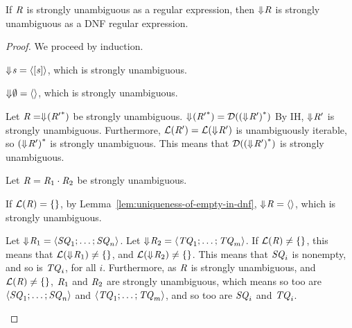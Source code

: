 \documentclass[numbers,10pt,preprint\ifanon ,nocopyrightspace\fi]{sigplanconf}
\begin{document}
\begin{lemma}
  \label{lem:retaining-unambiguity-todnf}
  If $\mathit{R}$ is strongly unambiguous as a regular expression, then
  $\Downarrow\mkern-4mu \mathit{R}$ is strongly unambiguous as a DNF regular expression.
\end{lemma}
\begin{proof}
  We proceed by induction.
  \begin{case}[\BaseRegexType{}]
    $\Downarrow\mkern-4mu \mathit{s} = \langle[\mathit{s}]\rangle$, which is strongly
    unambiguous.
  \end{case}

  \begin{case}[\EmptyRegexType{}]
    $\Downarrow\mkern-4mu \emptyset = \langle\rangle$, which is strongly unambiguous.
  \end{case}

  \begin{case}[\StarRegexType{}]
    Let $\mathit{R} = \Downarrow\mkern-4mu ({\mathit{R}'}^*)$ be strongly unambiguous.
    $\Downarrow\mkern-4mu ({\mathit{R}'}^*) =
    \mathcal{D}({(\Downarrow\mkern-4mu \mathit{R}')}^*)$
    By IH, $\Downarrow\mkern-4mu \mathit{R}'$ is strongly unambiguous.
    Furthermore, $\mathcal{L}(\mathit{R}') = \mathcal{L}(\Downarrow\mkern-4mu \mathit{R}')$ is
    unambiguously iterable, so ${(\Downarrow\mkern-4mu \mathit{R}')}^*$ is strongly
    unambiguous.  This means that
    $\mathcal{D}({(\Downarrow\mkern-4mu \mathit{R}')}^*)$ is strongly unambiguous.
  \end{case}

  \begin{case}[\ConcatRegexType{}]
    Let $\mathit{R} = \mathit{R}_1 \cdot \mathit{R}_2$ be strongly unambiguous.

    If $\mathcal{L}(\mathit{R}) = \{\}$, by
    Lemma~\ref{lem:uniqueness-of-empty-in-dnf}, $\Downarrow\mkern-4mu \mathit{R} =
    \langle\rangle$, which is strongly unambiguous.

    Let $\Downarrow\mkern-4mu \mathit{R}_1 = \langle\mathit{SQ}_1;\ldots;\mathit{SQ}_n\rangle$.
    Let $\Downarrow\mkern-4mu \mathit{R}_2 = \langle\mathit{TQ}_1;\ldots;\mathit{TQ}_m\rangle$.
    If $\mathcal{L}(\mathit{R}) \neq \{\}$, this means that
    $\mathcal{L}(\Downarrow\mkern-4mu \mathit{R}_1) \neq \{\}$, and
    $\mathcal{L}(\Downarrow\mkern-4mu \mathit{R}_2) \neq \{\}$.
    This means that $\mathit{SQ}_i$ is nonempty, and so is $\mathit{TQ}_i$, for
    all $i$.
    Furthermore, as $\mathit{R}$ is strongly unambiguous, and $\mathcal{L}(\mathit{R})
    \neq \{\}$, $\mathit{R}_1$ and $\mathit{R}_2$ are strongly unambiguous,
    which means so too are $\langle\mathit{SQ}_1;\ldots;\mathit{SQ}_n\rangle$ and
    $\langle\mathit{TQ}_1;\ldots;\mathit{TQ}_m\rangle$, and so too are
    $\mathit{SQ}_i$ and $\mathit{TQ}_i$.


\end{case}
\end{proof}
\end{document}
